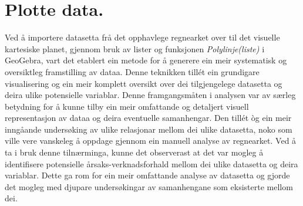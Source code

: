 \documentclass{report}
\begin{document}
\section{Plotte data.}
Ved å importere datasetta frå det opphavlege regnearket over til det visuelle kartesiske planet, gjennom bruk av lister og funksjonen \textit{Polylinje(liste)} i GeoGebra, vart det etablert ein metode for å generere ein meir systematisk og oversiktleg framstilling av dataa. Denne teknikken tillét ein grundigare visualisering og ein meir komplett oversikt over dei tilgjengelege datasetta og deira ulike potensielle variablar.
Denne framgangsmåten i analysen var av særleg betydning for å kunne tilby ein meir omfattande og detaljert visuell representasjon av dataa og deira eventuelle samanhengar. Den tillét òg ein meir inngåande undersøking av ulike relasjonar mellom dei ulike datasetta, noko som ville vere vanskeleg å oppdage gjennom ein manuell analyse av regnearket.
Ved å ta i bruk denne tilnærminga, kunne det observerast at det var mogleg å identifisere potensielle årsaks-verknadsforhald mellom dei ulike datasetta og deira variablar. Dette ga rom for ein meir omfattande analyse av datasetta og gjorde det mogleg med djupare undersøkingar av samanhengane som eksisterte mellom dei.
\end{document}
